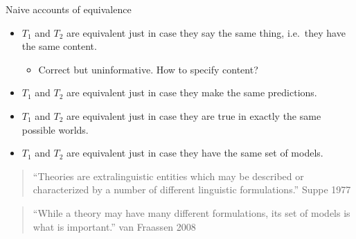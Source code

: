 \documentclass{beamer}
\begin{document}
\begin{frame}{Naive accounts of equivalence}

\begin{itemize}
\item $T_1$ and $T_2$ are equivalent just in case they say the same
  thing, i.e.\ they have the same content.
\begin{itemize}
\item Correct but uninformative.  How to specify content?
\end{itemize}
\end{itemize}

\begin{itemize}
\item $T_1$ and $T_2$ are equivalent just in case they make the same
  predictions.
\end{itemize}


\begin{itemize}
\item $T_1$ and $T_2$ are equivalent just in case they are true in
  exactly the same possible worlds.
\end{itemize}

\begin{itemize}
\item $T_1$ and $T_2$ are equivalent just in case they have the same
  set of models.
\end{itemize}
\end{frame}

\begin{frame}

  \begin{quote} ``Theories are extralinguistic entities which may be
    described or characterized by a number of different linguistic
    formulations.'' Suppe 1977 \end{quote}

  \begin{quote} ``While a theory may have many different formulations,
    its set of models is what is important.''  van Fraassen
    2008 \end{quote}



\end{frame}
\end{document}
